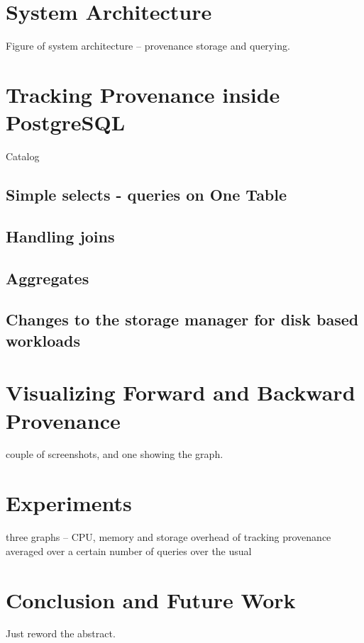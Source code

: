 \documentclass[11pt]{article}
\begin{document}
\section{System Architecture}

Figure of system architecture -- provenance storage and querying.

\section{Tracking Provenance inside PostgreSQL}
Catalog

\subsection{Simple selects - queries on One Table}

\subsection{Handling joins}

\subsection{Aggregates}

\subsection{Changes to the storage manager for disk based workloads}

\section{Visualizing Forward and Backward Provenance}

couple of screenshots, and one showing the graph.

\section{Experiments}

three graphs -- CPU, memory and storage overhead of tracking provenance averaged over a certain number of queries over the usual

\section{Conclusion and Future Work}

Just reword the abstract.



\end{document}
